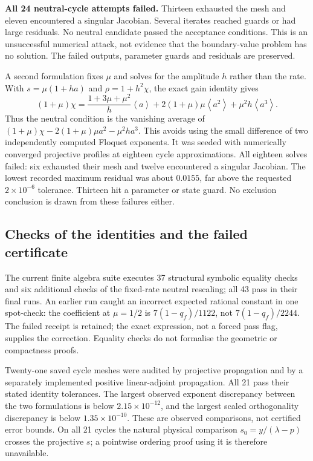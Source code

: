 \documentclass[11pt,a4paper]{article}
\theoremstyle{remark}\newtheorem{remark}[theorem]{Remark}
\newcommand{\av}[1]{\left\langle #1\right\rangle}
\begin{document}
\textbf{All 24 neutral-cycle attempts failed.} Thirteen exhausted the mesh and eleven encountered a singular Jacobian. Several iterates reached guards or had large residuals. No neutral candidate passed the acceptance conditions. This is an unsuccessful numerical attack, not evidence that the boundary-value problem has no solution. The failed outputs, parameter guards and residuals are preserved.

A second formulation fixes $\mu$ and solves for the amplitude $h$ rather than the rate. With $s=\mu(1+ha)$ and $\rho=1+h^2\chi$, the exact gain identity gives
\[
 (1+\mu)\chi=\frac{1+3\mu+\mu^2}{h}\av{a}
 +2(1+\mu)\mu\av{a^2}+\mu^2h\av{a^3}.
\]
Thus the neutral condition is the vanishing average of $(1+\mu)\chi-2(1+\mu)\mu a^2-\mu^2ha^3$. This avoids using the small difference of two independently computed Floquet exponents. It was seeded with numerically converged projective profiles at eighteen cycle approximations. All eighteen solves failed: six exhausted their mesh and twelve encountered a singular Jacobian. The lowest recorded maximum residual was about $0.0155$, far above the requested $2\times10^{-6}$ tolerance. Thirteen hit a parameter or state guard. No exclusion conclusion is drawn from these failures either.

\subsection{Checks of the identities and the failed certificate}
The current finite algebra suite executes 37 structural symbolic equality checks and six additional checks of the fixed-rate neutral rescaling; all 43 pass in their final runs. An earlier run caught an incorrect expected rational constant in one spot-check: the coefficient at $\mu=1/2$ is $7(1-q_f)/1122$, not $7(1-q_f)/2244$. The failed receipt is retained; the exact expression, not a forced pass flag, supplies the correction. Equality checks do not formalise the geometric or compactness proofs.

Twenty-one saved cycle meshes were audited by projective propagation and by a separately implemented positive linear-adjoint propagation. All 21 pass their stated identity tolerances. The largest observed exponent discrepancy between the two formulations is below $2.15\times10^{-12}$, and the largest scaled orthogonality discrepancy is below $1.35\times10^{-10}$. These are observed comparisons, not certified error bounds. On all 21 cycles the natural physical comparison $s_0=y/(\lambda-p)$ crosses the projective $s$; a pointwise ordering proof using it is therefore unavailable.
\end{document}
